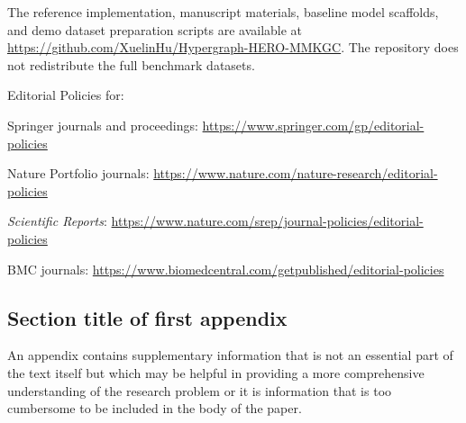\documentclass[pdflatex,sn-mathphys-num]{sn-jnl}%
\theoremstyle{thmstyleone}%
\theoremstyle{thmstyletwo}%
\theoremstyle{thmstylethree}%
\begin{document}
The reference implementation, manuscript materials, baseline model scaffolds, and demo dataset preparation scripts are available at \url{https://github.com/XuelinHu/Hypergraph-HERO-MMKGC}. The repository does not redistribute the full benchmark datasets.
\bigskip
\begin{flushleft}%
Editorial Policies for:

\bigskip\noindent
Springer journals and proceedings: \url{https://www.springer.com/gp/editorial-policies}

\bigskip\noindent
Nature Portfolio journals: \url{https://www.nature.com/nature-research/editorial-policies}

\bigskip\noindent
\textit{Scientific Reports}: \url{https://www.nature.com/srep/journal-policies/editorial-policies}

\bigskip\noindent
BMC journals: \url{https://www.biomedcentral.com/getpublished/editorial-policies}
\end{flushleft}

\begin{appendices}

\section{Section title of first appendix}\label{secA1}

An appendix contains supplementary information that is not an essential part of the text itself but which may be helpful in providing a more comprehensive understanding of the research problem or it is information that is too cumbersome to be included in the body of the paper.




\end{appendices}
\end{document}
